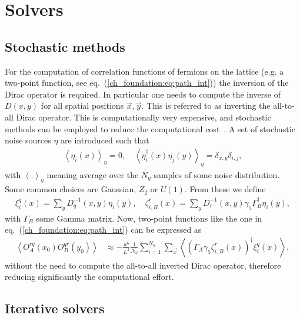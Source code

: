 
\chapter{Solvers}
\label{appex_solvers}

\section{Stochastic methods}

For the computation of correlation functions of fermions on the lattice (e.g. a two-point function, see eq.~(\ref{ch_foundation:eq:path_int})) the inversion of the Dirac operator is required. In particular one needs to compute the inverse of $D(x,y)$ for all spatial positions $\vec{x},\vec{y}$. This is referred to as inverting the all-to-all Dirac operator. This is computationally very expensive, and stochastic methods can be employed to reduce the computational cost~\citep{Luscher:2010ae}. A set of stochastic noise sources $\eta$ are introduced such that
\begin{gather}
\left<\eta_i(x)\right>_{\eta}=0, \quad \left<\eta_i^{\dagger}(x)\eta_j(y)\right>_{\eta}=\delta_{x,y}\delta_{i,j},
\end{gather}
with $\left<.\right>_{\eta}$ meaning average over the $N_{\eta}$ samples of some noise distribution. Some common choices are Gaussian, $Z_2$ or $U(1)$. From these we define
\begin{gather}
\xi_i^q(x)=\sum_yD^{-1}_q(x,y)\eta_i(y), \quad \zeta_{i,B}^r(x)=\sum_yD^{-1}_r(x,y)\gamma_5\Gamma_B^{\dagger}\eta_i(y),
\end{gather}
with $\Gamma_B$ some Gamma matrix. Now, two-point functions like the one in eq.~(\ref{ch_foundation:eq:path_int}) can be expressed as
\begin{align}
\left<O^{rq}_A(x_0)O^{qr}_B(y_0)\right>&\approx -\frac{a^6}{L^3}\frac{1}{N_{\eta}}\sum_{i=1}^{N_{\eta}}\sum_{\vec{x}}\left<(\Gamma_A\gamma_5\zeta^r_{i,B}(x))^{\dagger}\xi^q_i(x)\right>,
\end{align}
without the need to compute the all-to-all inverted Dirac operator, therefore reducing significantly the computational effort.

\section{Iterative solvers}

